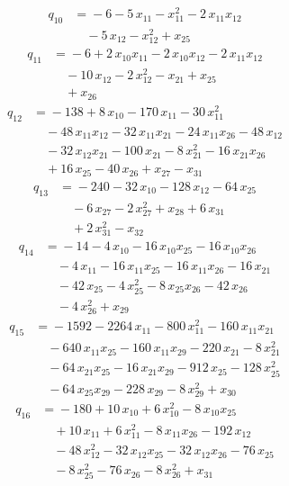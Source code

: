 \begin{align*}
q_{10} &={}-6 -5\,x_{11} -x_{11}^{2} -2\,x_{11}x_{12}\\
&\quad -5\,x_{12} -x_{12}^{2} +x_{25}
\end{align*}
\begin{align*}
q_{11} &={}-6 +2\,x_{10}x_{11} -2\,x_{10}x_{12} -2\,x_{11}x_{12}\\
&\quad -10\,x_{12} -2\,x_{12}^{2} -x_{21} +x_{25}\\
&\quad +x_{26}
\end{align*}
\begin{align*}
q_{12} &={}-138 +8\,x_{10} -170\,x_{11} -30\,x_{11}^{2}\\
&\quad -48\,x_{11}x_{12} -32\,x_{11}x_{21} -24\,x_{11}x_{26} -48\,x_{12}\\
&\quad -32\,x_{12}x_{21} -100\,x_{21} -8\,x_{21}^{2} -16\,x_{21}x_{26}\\
&\quad +16\,x_{25} -40\,x_{26} +x_{27} -x_{31}
\end{align*}
\begin{align*}
q_{13} &={}-240 -32\,x_{10} -128\,x_{12} -64\,x_{25}\\
&\quad -6\,x_{27} -2\,x_{27}^{2} +x_{28} +6\,x_{31}\\
&\quad +2\,x_{31}^{2} -x_{32}
\end{align*}
\begin{align*}
q_{14} &={}-14 -4\,x_{10} -16\,x_{10}x_{25} -16\,x_{10}x_{26}\\
&\quad -4\,x_{11} -16\,x_{11}x_{25} -16\,x_{11}x_{26} -16\,x_{21}\\
&\quad -42\,x_{25} -4\,x_{25}^{2} -8\,x_{25}x_{26} -42\,x_{26}\\
&\quad -4\,x_{26}^{2} +x_{29}
\end{align*}
\begin{align*}
q_{15} &={}-1592 -2264\,x_{11} -800\,x_{11}^{2} -160\,x_{11}x_{21}\\
&\quad -640\,x_{11}x_{25} -160\,x_{11}x_{29} -220\,x_{21} -8\,x_{21}^{2}\\
&\quad -64\,x_{21}x_{25} -16\,x_{21}x_{29} -912\,x_{25} -128\,x_{25}^{2}\\
&\quad -64\,x_{25}x_{29} -228\,x_{29} -8\,x_{29}^{2} +x_{30}
\end{align*}
\begin{align*}
q_{16} &={}-180 +10\,x_{10} +6\,x_{10}^{2} -8\,x_{10}x_{25}\\
&\quad +10\,x_{11} +6\,x_{11}^{2} -8\,x_{11}x_{26} -192\,x_{12}\\
&\quad -48\,x_{12}^{2} -32\,x_{12}x_{25} -32\,x_{12}x_{26} -76\,x_{25}\\
&\quad -8\,x_{25}^{2} -76\,x_{26} -8\,x_{26}^{2} +x_{31}
\end{align*}
